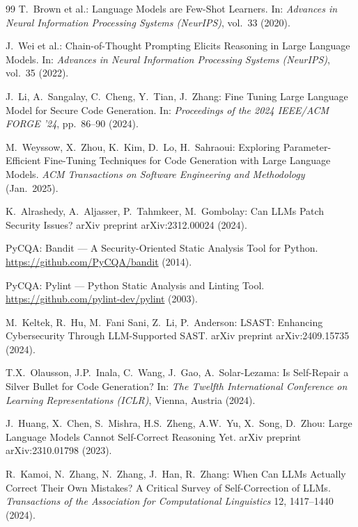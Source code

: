 \documentclass[runningheads]{llncs}
\begin{document}
\begin{thebibliography}{99}
T.\ Brown et al.:
Language Models are Few-Shot Learners.
In: \textit{Advances in Neural Information Processing Systems (NeurIPS)}, vol.\ 33 (2020).

J.\ Wei et al.:
Chain-of-Thought Prompting Elicits Reasoning in Large Language Models.
In: \textit{Advances in Neural Information Processing Systems (NeurIPS)}, vol.\ 35 (2022).

J.\ Li, A.\ Sangalay, C.\ Cheng, Y.\ Tian, J.\ Zhang:
Fine Tuning Large Language Model for Secure Code Generation.
In: \textit{Proceedings of the 2024 IEEE/ACM FORGE '24}, pp.\ 86--90 (2024).

M.\ Weyssow, X.\ Zhou, K.\ Kim, D.\ Lo, H.\ Sahraoui:
Exploring Parameter-Efficient Fine-Tuning Techniques for Code Generation with Large Language Models.
\textit{ACM Transactions on Software Engineering and Methodology} (Jan.\ 2025).

K.\ Alrashedy, A.\ Aljasser, P.\ Tahmkeer, M.\ Gombolay:
Can LLMs Patch Security Issues?
arXiv preprint arXiv:2312.00024 (2024).

PyCQA:
Bandit --- A Security-Oriented Static Analysis Tool for Python.
\url{https://github.com/PyCQA/bandit} (2014).

PyCQA:
Pylint --- Python Static Analysis and Linting Tool.
\url{https://github.com/pylint-dev/pylint} (2003).

M.\ Keltek, R.\ Hu, M.\ Fani Sani, Z.\ Li, P.\ Anderson:
LSAST: Enhancing Cybersecurity Through LLM-Supported SAST.
arXiv preprint arXiv:2409.15735 (2024).

T.X.\ Olausson, J.P.\ Inala, C.\ Wang, J.\ Gao, A.\ Solar-Lezama:
Is Self-Repair a Silver Bullet for Code Generation?
In: \textit{The Twelfth International Conference on Learning Representations (ICLR)}, Vienna, Austria (2024).

J.\ Huang, X.\ Chen, S.\ Mishra, H.S.\ Zheng, A.W.\ Yu, X.\ Song, D.\ Zhou:
Large Language Models Cannot Self-Correct Reasoning Yet.
arXiv preprint arXiv:2310.01798 (2023).

R.\ Kamoi, N.\ Zhang, N.\ Zhang, J.\ Han, R.\ Zhang:
When Can LLMs Actually Correct Their Own Mistakes? A Critical Survey of Self-Correction of LLMs.
\textit{Transactions of the Association for Computational Linguistics} 12, 1417--1440 (2024).


\end{thebibliography}
\end{document}
